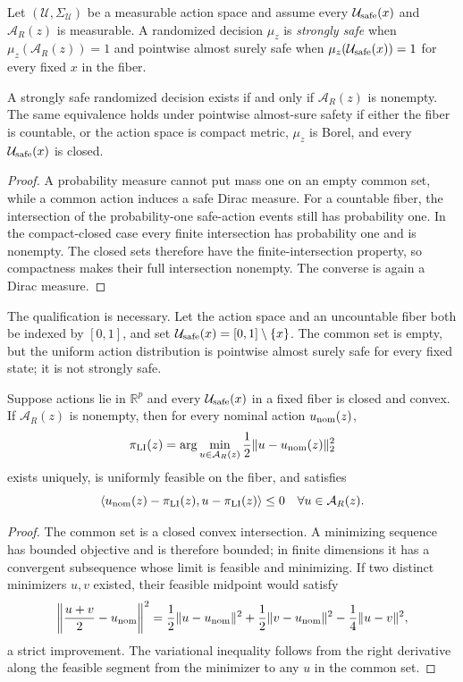 Let $(\mathcal U,\Sigma_{\mathcal U})$ be a measurable action space and assume every
$\mathcal{U}_{\mathrm{safe}}(x)$ and $\mathcal A_R(z)$ is measurable.  A randomized decision $\mu_z$ is
\emph{strongly safe} when $\mu_z(\mathcal A_R(z))=1$ and pointwise almost surely safe when
$\mu_z(\mathcal{U}_{\mathrm{safe}}(x))=1$ for every fixed $x$ in the fiber.

\begin{theorem}\label{thm:rand-action}
A strongly safe randomized decision exists if and only if $\mathcal A_R(z)$ is nonempty.  The same
equivalence holds under pointwise almost-sure safety if either the fiber is countable, or the action
space is compact metric, $\mu_z$ is Borel, and every $\mathcal{U}_{\mathrm{safe}}(x)$ is closed.
\end{theorem}

\begin{proof}
A probability measure cannot put mass one on an empty common set, while a common action induces a
safe Dirac measure.  For a countable fiber, the intersection of the probability-one safe-action
events still has probability one.  In the compact-closed case every finite intersection has
probability one and is nonempty.  The closed sets therefore have the finite-intersection property,
so compactness makes their full intersection nonempty.  The converse is again a Dirac measure.
\end{proof}

The qualification is necessary.  Let the action space and an uncountable fiber both be indexed by
$[0,1]$, and set $\mathcal{U}_{\mathrm{safe}}(x)=[0,1]\setminus\{x\}$.  The common set is empty, but the uniform action
distribution is pointwise almost surely safe for every fixed state; it is not strongly safe.

\begin{theorem}\label{thm:projection}
Suppose actions lie in $\mathbb R^p$ and every $\mathcal{U}_{\mathrm{safe}}(x)$ in a fixed fiber is closed and convex.
If $\mathcal A_R(z)$ is nonempty, then for every nominal action $u_{\rm nom}(z)$,
\[
 \pi_{\rm LI}(z)=\arg\min_{u\in\mathcal A_R(z)}
 \frac12\|u-u_{\rm nom}(z)\|_2^2
\]
exists uniquely, is uniformly feasible on the fiber, and satisfies
\[
 \langle u_{\rm nom}(z)-\pi_{\rm LI}(z),u-\pi_{\rm LI}(z)\rangle\leq0
 \quad\forall u\in\mathcal A_R(z).
\]
\end{theorem}

\begin{proof}
The common set is a closed convex intersection.  A minimizing sequence has bounded objective and is
therefore bounded; in finite dimensions it has a convergent subsequence whose limit is feasible and
minimizing.  If two distinct minimizers $u,v$ existed, their feasible midpoint would satisfy
\[
 \left\|\frac{u+v}{2}-u_{\rm nom}\right\|^2
 =\frac12\|u-u_{\rm nom}\|^2+
   \frac12\|v-u_{\rm nom}\|^2-\frac14\|u-v\|^2,
\]
a strict improvement.  The variational inequality follows from the right derivative along the
feasible segment from the minimizer to any $u$ in the common set.
\end{proof}

